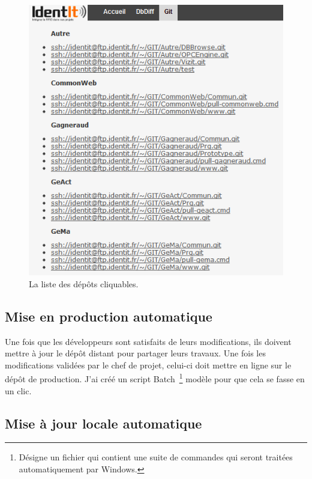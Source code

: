 \begin{figure}
    \begin{center}
        \includegraphics[scale=0.8]{images/repo.png}
        \caption{La liste des dépôts cliquables.}
        \label{repo}
    \end{center}
\end{figure}

\newpage

\subsection{Mise en production automatique} %
\label{sub:Mise en production automatique}

Une fois que les développeurs sont satisfaits de leurs modifications,
ils doivent mettre à jour le dépôt distant pour partager leurs travaux.
Une fois les modifications validées par le chef de projet, celui-ci doit
mettre en ligne sur le dépôt de production. J'ai créé un script Batch\,
\footnote{Désigne un fichier qui contient une suite de commandes qui
seront traitées automatiquement par Windows.} \og modèle \fg{} pour
que cela se fasse en un clic.

\subsection{Mise à jour locale automatique} %
\label{sub:Mise à jour locale automatique}

